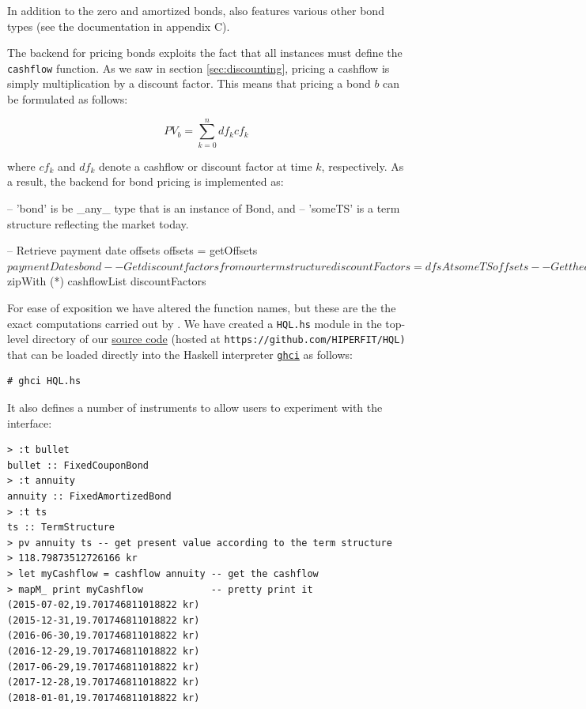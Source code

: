 In addition to the zero and amortized bonds, \hql also features various other
bond types (see the documentation in appendix C).

The backend for pricing bonds exploits the fact that all instances must define
the \texttt{cashflow} function. As we saw in section \ref{sec:discounting},
pricing a cashflow is simply multiplication by a discount factor. This means
that pricing a bond $b$ can be formulated as follows:

\begin{equation}
PV_b = \sum_{k=0}^n df_k cf_k
\end{equation}

where $cf_k$ and $df_k$ denote a cashflow or discount factor at time $k$,
respectively. As a result, the backend for bond pricing is implemented as:

\begin{hscode}
-- 'bond' is be _any_ type that is an instance of Bond, and 
-- 'someTS' is a term structure reflecting the market today.

-- Retrieve payment date offsets
offsets = getOffsets $ paymentDates bond 

-- Get discount factors from our term structure
discountFactors = dfsAt someTS offsets

-- Get the cashflow of the bond
cashflowList    = cashflow bond

-- Price it!
pv = sum $ zipWith (*) cashflowList discountFactors
\end{hscode}

For ease of exposition we have altered the function names, but these are the 
the exact computations carried out by \hql. We have created a \texttt{HQL.hs}
module in the top-level directory of our
\href{https://github.com/HIPERFIT/HQL}{source code} (hosted at 
\texttt{https://github.com/HIPERFIT/HQL)} that can be loaded directly into
the Haskell interpreter 
\href{http://www.haskell.org/haskellwiki/GHC/GHCi}{\texttt{ghci}} as follows:\\

\begin{lstlisting}[style=BashInputStyle]
# ghci HQL.hs
\end{lstlisting}
\vspace{0.3cm}
It also defines a number of instruments to allow users to experiment with the
interface:\\

\begin{lstlisting}[style=BashInputStyle]
> :t bullet
bullet :: FixedCouponBond
> :t annuity
annuity :: FixedAmortizedBond 
> :t ts
ts :: TermStructure 
> pv annuity ts -- get present value according to the term structure
> 118.79873512726166 kr
> let myCashflow = cashflow annuity -- get the cashflow
> mapM_ print myCashflow            -- pretty print it
(2015-07-02,19.701746811018822 kr)
(2015-12-31,19.701746811018822 kr)
(2016-06-30,19.701746811018822 kr)
(2016-12-29,19.701746811018822 kr)
(2017-06-29,19.701746811018822 kr)
(2017-12-28,19.701746811018822 kr)
(2018-01-01,19.701746811018822 kr)
\end{lstlisting}

